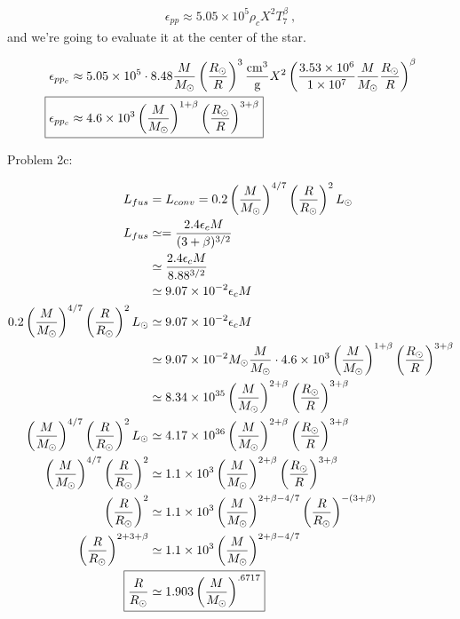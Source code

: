\documentclass[10pt,letter,preprint]{aastex}
\newcommand{\lp}{\left(}
\newcommand{\rp}{\right)}
\begin{document}
\begin{align}
\epsilon_{pp} \approx 5.05 \times 10^5 \rho_c X^2 T_7^\beta~,
\end{align}
and we're going to evaluate it at the center of the star.

\begin{align}
\epsilon_{pp_c} & \approx 5.05 \times 10^5 \cdot 8.48 \frac{M}{M_\odot} \left( \frac{R_\odot}{R} \right)^3 \frac{\text{cm}^3}{\text{g}} X^2 \left(\frac{3.53 \times 10^{6}}{1 \times 10^7} \frac{M}{M_\odot} \frac{R_\odot}{R}\right)^\beta\\
\Aboxed{\epsilon_{pp_c} & \approx 4.6 \times 10^{3} \left( \frac{M}{M_\odot} \right)^{1+\beta} \left( \frac{R_\odot}{R} \right)^{3+\beta}}
\end{align}

Problem 2c:

\begin{align}
L_{fus}  & = L_{conv} = 0.2 \lp \frac{M}{M_\odot} \rp^{4/7} \lp \frac{R}{R_\odot} \rp^2 L_\odot\\
L_{fus} & \simeq =\frac{2.4 \epsilon_c M}{(3 + \beta)^{3/2}}\\
& \simeq \frac{2.4 \epsilon_c M}{8.88^{3/2}}\\
& \simeq 9.07 \times 10^{-2} \epsilon_c M\\
0.2 \lp \frac{M}{M_\odot} \rp^{4/7} \lp \frac{R}{R_\odot} \rp^2 L_\odot & \simeq 9.07 \times 10^{-2} \epsilon_c M\\
& \simeq 9.07 \times 10^{-2}M_\odot \frac{M}{M_\odot} \cdot 4.6 \times 10^{3} \left( \frac{M}{M_\odot} \right)^{1+\beta} \left( \frac{R_\odot}{R} \right)^{3+\beta}\\
& \simeq 8.34 \times 10^{35} \left( \frac{M}{M_\odot} \right)^{2+\beta} \left( \frac{R_\odot}{R} \right)^{3+\beta}\\
\lp \frac{M}{M_\odot} \rp^{4/7} \lp \frac{R}{R_\odot} \rp^2 L_\odot & \simeq 4.17 \times 10^{36} \left( \frac{M}{M_\odot} \right)^{2+\beta} \left( \frac{R_\odot}{R} \right)^{3+\beta}\\
\lp \frac{M}{M_\odot} \rp^{4/7} \lp \frac{R}{R_\odot} \rp^2 & \simeq 1.1 \times 10^{3} \left( \frac{M}{M_\odot} \right)^{2+\beta} \left( \frac{R_\odot}{R} \right)^{3+\beta}\\
\lp \frac{R}{R_\odot} \rp^2 & \simeq 1.1 \times 10^{3} \left( \frac{M}{M_\odot} \right)^{2+\beta - 4/7}\left( \frac{R}{R_\odot} \right)^{-(3+\beta)}\\
\lp \frac{R}{R_\odot} \rp^{2 + 3+ \beta}& \simeq 1.1 \times 10^{3} \left( \frac{M}{M_\odot} \right)^{2+\beta - 4/7}\\
\Aboxed{\frac{R}{R_\odot} & \simeq 1.903 \left( \frac{M}{M_\odot} \right)^{.6717}}
\end{align}
\end{document}
